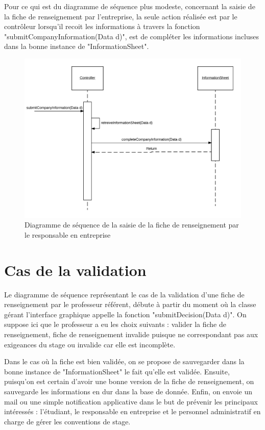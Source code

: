 \documentclass{scrreprt}
\begin{document}
	Pour ce qui est du diagramme de séquence plus modeste, concernant la saisie de la fiche de renseignement par l'entreprise, 
la seule action réalisée est par le contrôleur lorsqu'il recoit les informations à travers la fonction "submitCompanyInformation(Data d)",
est de compléter les informations incluses dans la bonne instance de "InformationSheet".

\begin{figure}[h]
\centering
\includegraphics[width=15cm]{images/submitCompanySeqDiagram.png}
\caption{Diagramme de séquence de la saisie de la fiche de renseignement par le responsable en entreprise}
\end{figure}

\newpage
\section{Cas de la validation}

	Le diagramme de séquence représentant le cas de la validation d'une fiche de renseignement par le professeur référent, débute 
à partir du moment où la classe gérant l'interface graphique appelle la fonction "submitDecision(Data d)". On suppose ici que 
le professeur a eu les choix suivants : valider la fiche de renseignement, fiche de renseignement invalide puisque ne correspondant 
pas aux exigeances du stage ou invalide car elle est incomplète. 

	Dans le cas où la fiche est bien validée, on se propose de sauvegarder dans la bonne instance de "InformationSheet" le fait qu'elle est 
validée. Ensuite, puisqu'on est certain d'avoir une bonne version de la fiche de renseignement, on sauvegarde les informations en dur 
dans la base de donnée. Enfin, on envoie un mail ou une simple notification applicative dans le but de prévenir les principaux intéressés :
l'étudiant, le responsable en entreprise et le personnel administratif en charge de gérer les conventions de stage.
\end{document}
